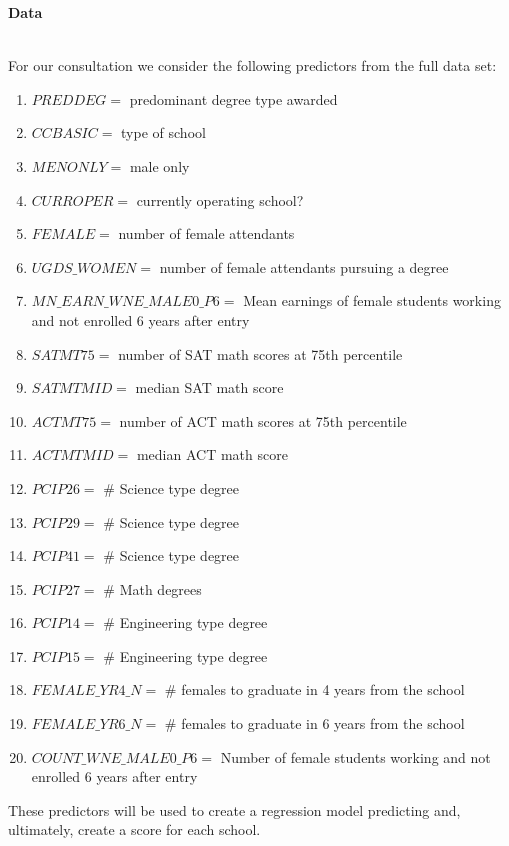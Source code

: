 \documentclass{article}
\begin{document}


{\large\textbf{Data}} \\\

For our consultation we consider the following predictors from the full data set:
\begin{enumerate}
\item $ PREDDEG =$ predominant degree type awarded
\item $ CCBASIC =$ type of school
\item $ MENONLY =$ male only
\item $ CURROPER =$ currently operating school?
\item $ FEMALE =$ number of female attendants
\item $ UGDS\_WOMEN =$ number of female attendants pursuing a degree
\item $ MN\_EARN\_WNE\_MALE0\_P6 =$ Mean earnings of female students working and not enrolled 6 years after entry
\item $ SATMT75 =$ number of SAT math scores at 75th percentile
\item $ SATMTMID =$ median SAT math score
\item $ ACTMT75 =$ number of ACT math scores at 75th percentile
\item $ ACTMTMID =$ median ACT math score
\item $ PCIP26 =$ \# Science type degree
\item $ PCIP29 =$ \# Science type degree
\item $ PCIP41 =$ \# Science type degree
\item $ PCIP27 =$ \# Math degrees
\item $ PCIP14 =$ \# Engineering type degree
\item $ PCIP15 =$ \# Engineering type degree
\item $ FEMALE\_YR4\_N =$ \# females to graduate in 4 years from the school
\item $ FEMALE\_YR6\_N =$ \# females to graduate in 6 years from the school
\item $ COUNT\_WNE\_MALE0\_P6 =$ Number of female students working and not enrolled 6 years after entry
\end{enumerate}

These predictors will be used to create a regression model predicting and, ultimately, create a score for each school.
\end{document}
